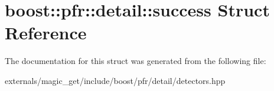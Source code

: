 \hypertarget{structboost_1_1pfr_1_1detail_1_1success}{}\section{boost\+:\+:pfr\+:\+:detail\+:\+:success Struct Reference}
\label{structboost_1_1pfr_1_1detail_1_1success}


The documentation for this struct was generated from the following file\+:\begin{DoxyCompactItemize}
\item 
externals/magic\+\_\+get/include/boost/pfr/detail/detectors.\+hpp\end{DoxyCompactItemize}

